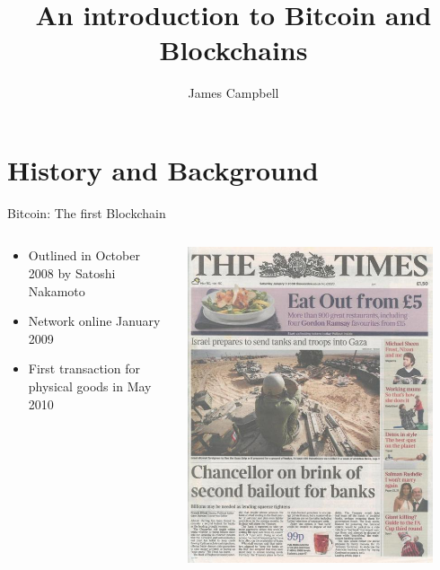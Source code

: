 \documentclass{beamer}
\title{An introduction to Bitcoin and Blockchains}
\author{James Campbell}
\institute[Cardiff University]
  {
  Department of Mathematics\\
  Cardiff University
  }
\begin{document}
\begin{frame}
  \titlepage
\end{frame}


\section{History and Background}


\begin{frame}{Bitcoin: The first Blockchain}
\begin{columns}
  \begin{column}{0.5\textwidth}
    \begin{itemize}
      \item Outlined in October 2008 by Satoshi Nakamoto \cite{Nakamoto}
      \item Network online January 2009 \cite{GenesisBlock}
      \item First transaction for physical goods in May 2010
    \end{itemize}
  \end{column}
  \begin{column}{0.5\textwidth} 
    \begin{center}
      \includegraphics[width=0.9\textwidth]{images/the_times.jpg}
    \end{center}
  \end{column}
\end{columns}
\end{frame}
\end{document}
